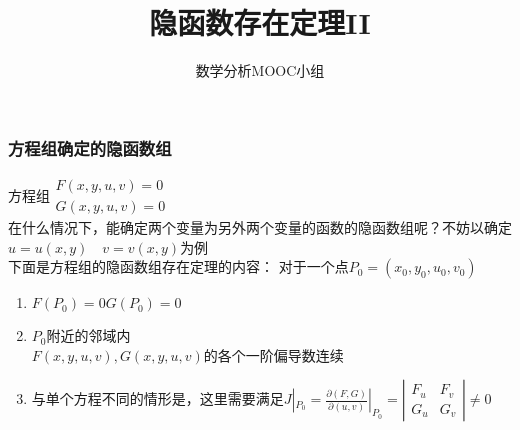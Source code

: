 \documentclass[xetex]{beamer}
\title{隐函数存在定理II}
\author{数学分析MOOC小组}
\date{}
\begin{document}
\frame{\maketitle}

\begin{frame}
    \frametitle{方程组确定的隐函数组}
    方程组$
    \begin{matrix}
    F(x,y,u,v)=0\\
    G(x,y,u,v)=0
    \end{matrix}
	$\\
    在什么情况下，能确定两个变量为另外两个变量的函数的隐函数组呢？不妨以确定$u=u(x,y)\quad v=v(x,y)$为例\\
    下面是方程组的隐函数组存在定理的内容：
    对于一个点$P_0=(x_0,y_0,u_0,v_0)$\\
    \begin{enumerate}
    	\item $F(P_0)=0$\quad $G(P_0)=0$
    	\item $P_0$附近的邻域内\\
    	$F(x,y,u,v),G(x,y,u,v)$的各个一阶偏导数连续\\
    	\item 与单个方程不同的情形是，这里需要满足$J|_{P_0}=\frac{\partial (F,G)}{\partial (u,v)}|_{P_0}=
    	\left|\begin{matrix}
    		F_u&F_v\\
    		G_u&G_v
    	\end{matrix}\right|
    	\not =0$\\
    	
    \end{enumerate}
    
\end{frame}
\end{document}
